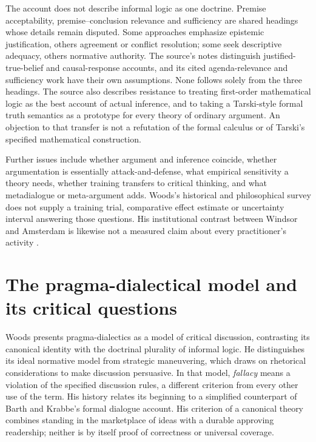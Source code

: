 The account does not describe informal logic as one doctrine. Premise
acceptability, premise--conclusion relevance and sufficiency are shared
headings whose details remain disputed. Some approaches emphasize
epistemic justification, others agreement or conflict resolution;
some seek descriptive adequacy, others normative authority. The source's
notes distinguish justified-true-belief and causal-response accounts,
and its cited agenda-relevance and sufficiency work have their own
assumptions. None follows solely from the three headings.
The source also describes resistance to treating first-order mathematical
logic as the best account of actual inference, and to taking a
Tarski-style formal truth semantics as a prototype for every theory of
ordinary argument. An objection to that transfer is not a refutation
of the formal calculus or of Tarski's specified mathematical construction.

Further issues include whether argument and inference coincide, whether
argumentation is essentially attack-and-defense, what empirical sensitivity
a theory needs, whether training transfers to critical thinking, and what
metadialogue or meta-argument adds. Woods's historical and philosophical
survey does not supply a training trial, comparative effect estimate
or uncertainty interval answering those questions. His institutional
contrast between Windsor and Amsterdam is likewise not a measured
claim about every practitioner's activity
\cite[pp.~371--372 and notes~17--22]{Woods2021ReasoningArgumentation}.

\section{The pragma-dialectical model and its critical questions}

Woods presents pragma-dialectics as a model of critical discussion,
contrasting its canonical identity with the doctrinal plurality of
informal logic. He distinguishes its ideal normative model from strategic
maneuvering, which draws on rhetorical considerations to make discussion
persuasive. In that model, \emph{fallacy} means a violation of the specified
discussion rules, a different criterion from every other use of the term.
His history relates its beginning to a simplified counterpart of Barth
and Krabbe's formal dialogue account. His criterion of a canonical theory
combines standing in the marketplace of ideas with a durable approving
readership; neither is by itself proof of correctness or universal coverage.

